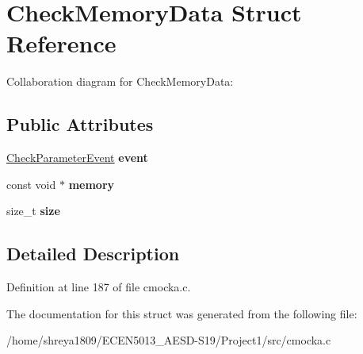 \hypertarget{structCheckMemoryData}{}\section{Check\+Memory\+Data Struct Reference}
\label{structCheckMemoryData}


Collaboration diagram for Check\+Memory\+Data\+:
\subsection*{Public Attributes}
\begin{DoxyCompactItemize}
\item 
\mbox{\label{structCheckMemoryData_afa102f599993f28924b9f73cf9b45990}} 
\hyperlink{structCheckParameterEvent}{Check\+Parameter\+Event} {\bfseries event}
\item 
\mbox{\label{structCheckMemoryData_aac7288cc682bfa7917c6258c56aeb723}} 
const void $\ast$ {\bfseries memory}
\item 
\mbox{\label{structCheckMemoryData_a0015b301a15e7b148e95aa1d6f51cb11}} 
size\+\_\+t {\bfseries size}
\end{DoxyCompactItemize}


\subsection{Detailed Description}


Definition at line 187 of file cmocka.\+c.



The documentation for this struct was generated from the following file\+:\begin{DoxyCompactItemize}
\item 
/home/shreya1809/\+E\+C\+E\+N5013\+\_\+\+A\+E\+S\+D-\/\+S19/\+Project1/src/cmocka.\+c\end{DoxyCompactItemize}
